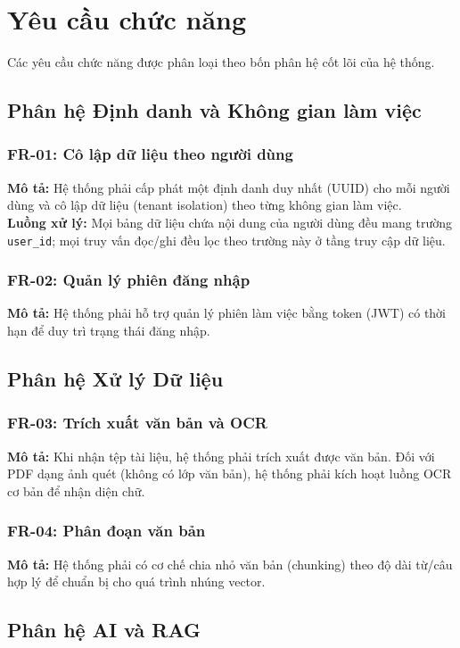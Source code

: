\section{Yêu cầu chức năng}
Các yêu cầu chức năng được phân loại theo bốn phân hệ cốt lõi của hệ thống.

\subsection{Phân hệ Định danh và Không gian làm việc}
\subsubsection{FR-01: Cô lập dữ liệu theo người dùng}
\textbf{Mô tả:} Hệ thống phải cấp phát một định danh duy nhất (UUID) cho mỗi người dùng và cô lập dữ liệu (tenant isolation) theo từng không gian làm việc.\\
\textbf{Luồng xử lý:} Mọi bảng dữ liệu chứa nội dung của người dùng đều mang trường \texttt{user\_id}; mọi truy vấn đọc/ghi đều lọc theo trường này ở tầng truy cập dữ liệu.

\subsubsection{FR-02: Quản lý phiên đăng nhập}
\textbf{Mô tả:} Hệ thống phải hỗ trợ quản lý phiên làm việc bằng token (JWT) có thời hạn để duy trì trạng thái đăng nhập.

\subsection{Phân hệ Xử lý Dữ liệu}
\subsubsection{FR-03: Trích xuất văn bản và OCR}
\textbf{Mô tả:} Khi nhận tệp tài liệu, hệ thống phải trích xuất được văn bản. Đối với PDF dạng ảnh quét (không có lớp văn bản), hệ thống phải kích hoạt luồng OCR cơ bản để nhận diện chữ.

\subsubsection{FR-04: Phân đoạn văn bản}
\textbf{Mô tả:} Hệ thống phải có cơ chế chia nhỏ văn bản (chunking) theo độ dài từ/câu hợp lý để chuẩn bị cho quá trình nhúng vector.

\subsection{Phân hệ AI và RAG}
